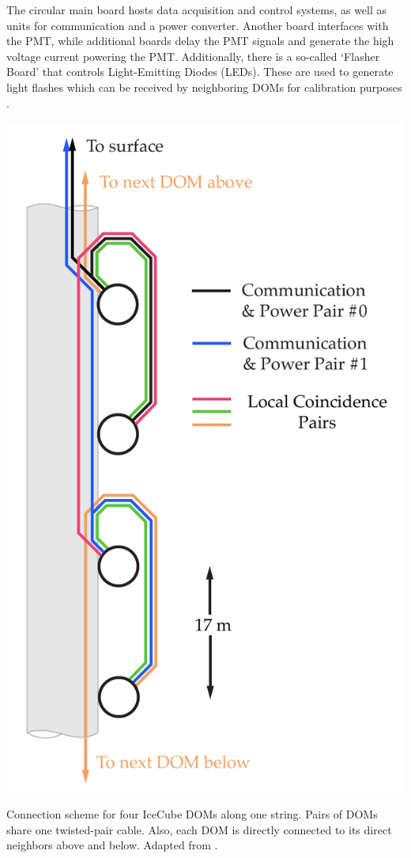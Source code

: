 \documentclass[
    a4paper, %
    fontsize=10pt, %
    twoside=false, %
    numbers=noenddot, %
    fontmethod=tex,
]{kaobook}
\begin{document}
The circular main board hosts data acquisition and control systems, as well as units for communication and a power converter. Another board interfaces with the PMT, while additional boards delay the PMT signals and generate the high voltage current powering the PMT. Additionally, there is a so-called `Flasher Board' that controls Light-Emitting Diodes (LEDs). These are used to generate light flashes which can be received by neighboring DOMs for calibration purposes .

\begin{marginfigure}
    \includegraphics{ic/ic_DOM_connections.pdf}
    \caption[IceCube DOM connections]{Connection scheme for four IceCube DOMs along one string. Pairs of DOMs share one twisted-pair cable. Also, each DOM is directly connected to its direct neighbors above and below. Adapted from \cite{Aartsen2017}.} 
\end{marginfigure}
\end{document}
